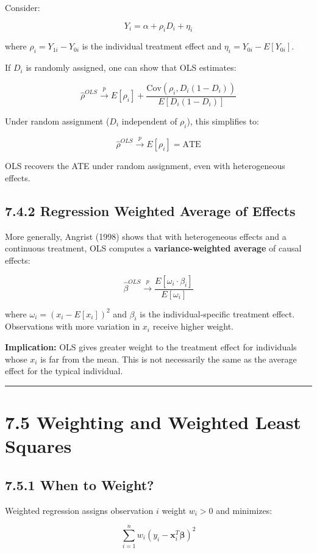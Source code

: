 Consider:

\[
Y_i = \alpha + \rho_i D_i + \eta_i
\]

where $\rho_i = Y_{1i} - Y_{0i}$ is the individual treatment effect and $\eta_i = Y_{0i} - E[Y_{0i}]$.

If $D_i$ is randomly assigned, one can show that OLS estimates:

\[
\hat{\rho}^{OLS} \xrightarrow{p} E[\rho_i] + \frac{\text{Cov}(\rho_i, D_i(1-D_i))}{E[D_i(1-D_i)]}
\]

Under random assignment ($D_i$ independent of $\rho_i$), this simplifies to:

\[
\hat{\rho}^{OLS} \xrightarrow{p} E[\rho_i] = \text{ATE}
\]

OLS recovers the ATE under random assignment, even with heterogeneous effects.

\subsection{7.4.2 Regression Weighted Average of Effects}

More generally, Angrist (1998) shows that with heterogeneous effects and a continuous treatment, OLS computes a \textbf{variance-weighted average} of causal effects:

\[
\hat{\beta}^{OLS} \xrightarrow{p} \frac{E[\omega_i \cdot \beta_i]}{E[\omega_i]}
\]

where $\omega_i = (x_i - E[x_i])^2$ and $\beta_i$ is the individual-specific treatment effect. Observations with more variation in $x_i$ receive higher weight.

\textbf{Implication:} OLS gives greater weight to the treatment effect for individuals whose $x_i$ is far from the mean. This is not necessarily the same as the average effect for the typical individual.

\medskip\hrule\medskip

\section{7.5 Weighting and Weighted Least Squares}

\subsection{7.5.1 When to Weight?}

Weighted regression assigns observation $i$ weight $w_i > 0$ and minimizes:

\[
\sum_{i=1}^n w_i (y_i - \mathbf{x}_i^T \boldsymbol{\beta})^2
\]

